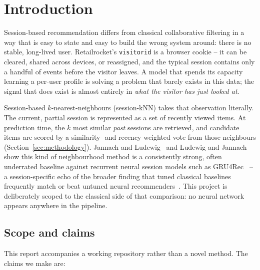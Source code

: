 \section{Introduction}
\label{sec:introduction}

Session-based recommendation differs from classical collaborative filtering
in a way that is easy to state and easy to build the wrong system around:
there is no stable, long-lived user. Retailrocket's \texttt{visitorid} is a
browser cookie -- it can be cleared, shared across devices, or reassigned,
and the typical session contains only a handful of events before the visitor
leaves. A model that spends its capacity learning a per-user profile is
solving a problem that barely exists in this data; the signal that does
exist is almost entirely in \emph{what the visitor has just looked at}.

Session-based $k$-nearest-neighbours (session-kNN) takes that observation
literally. The current, partial session is represented as a set of recently
viewed items. At prediction time, the $k$ most similar \emph{past} sessions
are retrieved, and candidate items are scored by a similarity- and
recency-weighted vote from those neighbours (Section~\ref{sec:methodology}).
Jannach and Ludewig~\cite{jannach2017knn} and Ludewig and
Jannach~\cite{ludewig2018evaluation} show this kind of neighbourhood method is
a consistently strong, often underrated baseline against recurrent neural
session models such as GRU4Rec~\cite{hidasi2016gru4rec} -- a session-specific
echo of the broader finding that tuned classical baselines frequently match
or beat untuned neural recommenders~\cite{dacrema2019}. This project is
deliberately scoped to the classical side of that comparison: no neural
network appears anywhere in the pipeline.

\subsection{Scope and claims}

This report accompanies a working repository rather than a novel method. The
claims we make are:

